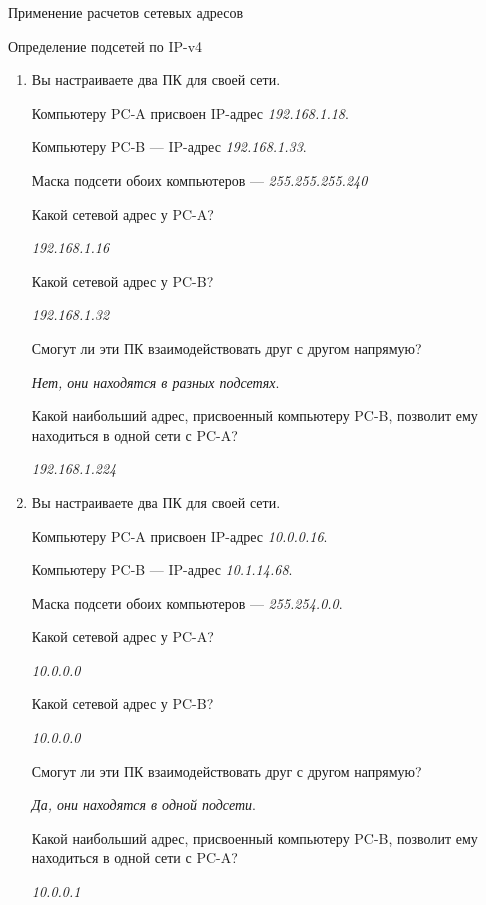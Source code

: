 \documentclass[a4paper,14pt]{extarticle}
\begin{document}
\begin{mypart}{Применение расчетов сетевых адресов}
	\begin{step}{Определение подсетей по IP-v4}
		
		\begin{enumerate}[label=\alph{enumi})]
			\item 
			Вы настраиваете два ПК для своей сети. 
			
			Компьютеру PC-A присвоен IP-адрес \textit{192.168.1.18}.
			
			Компьютеру PC-B — IP-адрес \textit{192.168.1.33}. 
			
			Маска подсети обоих компьютеров — \textit{255.255.255.240}
			
			\q Какой сетевой адрес у PC-A? 
			
			\ans \textit{192.168.1.16}
			
			\q Какой сетевой адрес у PC-B? 
			
			\ans \textit{192.168.1.32}
			
			\q Смогут ли эти ПК взаимодействовать друг с другом напрямую? 
			
			\ans \textit{Нет, они находятся в разных подсетях}.
			
			\q Какой наибольший адрес, присвоенный компьютеру PC-B, позволит ему находиться в одной сети с
			PC-A?
			
			\ans \textit{192.168.1.224}
			
			\item 
			Вы настраиваете два ПК для своей сети. 
			
			Компьютеру PC-A присвоен IP-адрес \textit{10.0.0.16}.
			
			Компьютеру PC-B — IP-адрес \textit{10.1.14.68}. 
			
			Маска подсети обоих компьютеров — \textit{255.254.0.0}.
			
			\q Какой сетевой адрес у PC-A? 
			
			\ans \textit{10.0.0.0}
			
			\q Какой сетевой адрес у PC-B? 
			
			\ans \textit{10.0.0.0}
			
			\q Смогут ли эти ПК взаимодействовать друг с другом напрямую? 
			
			\ans \textit{Да, они находятся в одной подсети}.
			
			\q Какой наибольший адрес, присвоенный компьютеру PC-B, позволит ему находиться в одной сети с
			PC-A?
			
			\ans \textit{10.0.0.1}
		\end{enumerate}
	\end{step}


\end{mypart}
\end{document}
